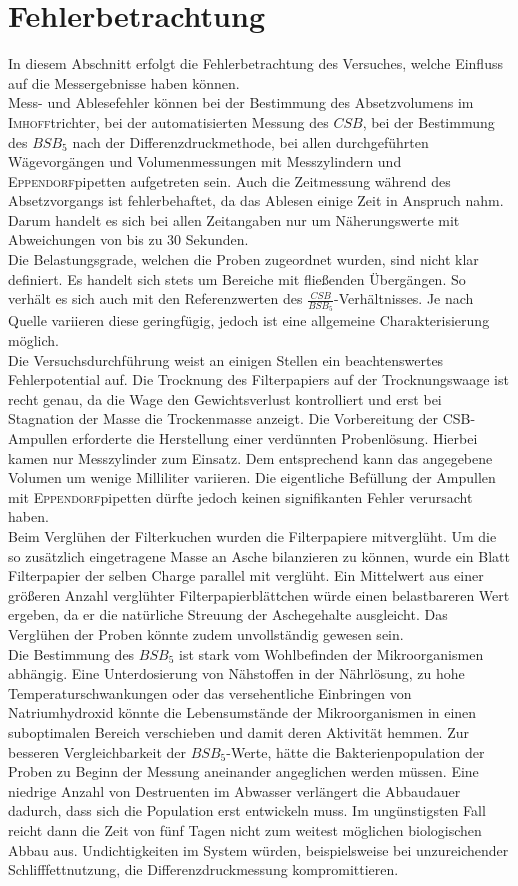 \chapter{Fehlerbetrachtung}
\label{sec:fehler}
In diesem Abschnitt erfolgt die Fehlerbetrachtung des Versuches, welche Einfluss auf die Messergebnisse haben können.\\

Mess- und Ablesefehler können bei der Bestimmung des Absetzvolumens im \textsc{Imhoff}trichter, bei der automatisierten Messung des $CSB$, bei der Bestimmung des $BSB_5$ nach der Differenzdruckmethode, bei allen durchgeführten Wägevorgängen und Volumenmessungen mit Messzylindern und \textsc{Eppendorf}pipetten aufgetreten sein. Auch die Zeitmessung während des Absetzvorgangs ist fehlerbehaftet, da das Ablesen einige Zeit in Anspruch nahm. Darum handelt es sich bei allen Zeitangaben nur um Näherungswerte mit Abweichungen von bis zu 30 Sekunden.\\
Die Belastungsgrade, welchen die Proben zugeordnet wurden, sind nicht klar definiert. Es handelt sich stets um Bereiche mit fließenden Übergängen. So verhält es sich auch mit den Referenzwerten des $\frac{CSB}{BSB_5}$-Verhältnisses. Je nach Quelle variieren diese geringfügig, jedoch ist eine allgemeine Charakterisierung möglich. \\
Die Versuchsdurchführung weist an einigen Stellen ein beachtenswertes Fehlerpotential auf. Die Trocknung des Filterpapiers auf der Trocknungswaage ist recht genau, da die Wage den Gewichtsverlust kontrolliert und erst bei Stagnation der Masse die Trockenmasse anzeigt. Die Vorbereitung der CSB-Ampullen erforderte die Herstellung einer verdünnten Probenlösung. Hierbei kamen nur Messzylinder zum Einsatz. Dem entsprechend kann das angegebene Volumen um wenige Milliliter variieren. Die eigentliche Befüllung der Ampullen mit \textsc{Eppendorf}pipetten dürfte jedoch keinen signifikanten Fehler verursacht haben. \\ 
Beim Verglühen der Filterkuchen wurden die Filterpapiere mitverglüht. Um die so zusätzlich eingetragene Masse an Asche bilanzieren zu können, wurde ein Blatt Filterpapier der selben Charge parallel mit verglüht. Ein Mittelwert aus einer größeren Anzahl verglühter Filterpapierblättchen würde einen belastbareren Wert ergeben, da er die natürliche Streuung der Aschegehalte ausgleicht. Das Verglühen der Proben könnte zudem unvollständig gewesen sein. \\
Die Bestimmung des $BSB_5$ ist stark vom Wohlbefinden der Mikroorganismen abhängig. Eine Unterdosierung von Nähstoffen in der Nährlösung, zu hohe Temperaturschwankungen oder das versehentliche Einbringen von Natriumhydroxid könnte die Lebensumstände der Mikroorganismen in einen suboptimalen Bereich verschieben und damit deren Aktivität hemmen. Zur besseren Vergleichbarkeit der $BSB_5$-Werte, hätte die Bakterienpopulation der Proben zu Beginn der Messung aneinander angeglichen werden müssen. Eine niedrige Anzahl von Destruenten im Abwasser verlängert die Abbaudauer dadurch, dass sich die Population erst entwickeln muss. Im ungünstigsten Fall reicht dann die Zeit von fünf Tagen nicht zum weitest möglichen biologischen Abbau aus. Undichtigkeiten im System würden, beispielsweise bei unzureichender Schlifffettnutzung, die Differenzdruckmessung kompromittieren. 
